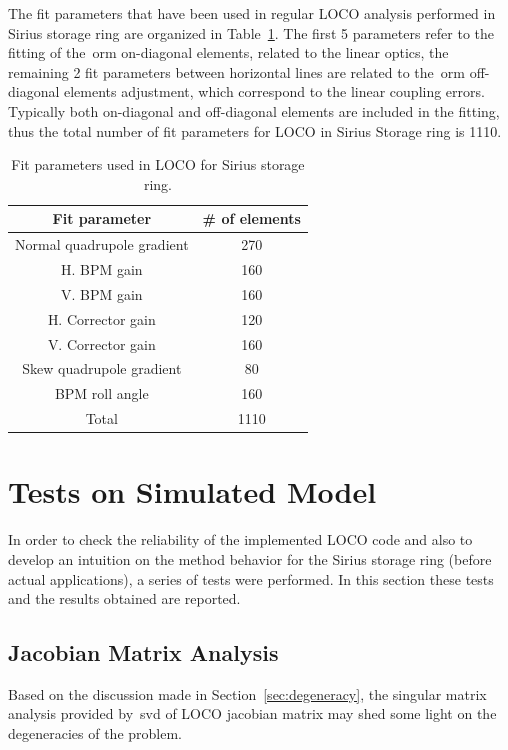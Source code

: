 The fit parameters that have been used in regular LOCO analysis performed in Sirius storage ring are organized in Table~\ref{tab:fit_params}. The first 5 parameters refer to the fitting of the~\gls{orm} on-diagonal elements, related to the linear optics, the remaining 2 fit parameters between horizontal lines are related to the~\gls{orm} off-diagonal elements adjustment, which correspond to the linear coupling errors. Typically both on-diagonal and off-diagonal elements are included in the fitting, thus the total number of fit parameters for LOCO in Sirius Storage ring is 1110.
\begin{table}
    \centering
    \caption{Fit parameters used in LOCO for Sirius storage ring.}
    \label{tab:fit_params}
    \begin{tabular}{cc}
        \toprule\toprule
        Fit parameter & \# of elements \\
        \hline
        Normal quadrupole gradient & 270 \\
        H. BPM gain & 160 \\
        V. BPM gain & 160 \\
        H. Corrector gain & 120 \\
        V. Corrector gain & 160 \\
        \hline
        Skew quadrupole gradient & 80 \\
        BPM roll angle & 160 \\ 
        \hline
        Total & 1110 \\
        \bottomrule\bottomrule
    \end{tabular}
\end{table}

\section{Tests on Simulated Model}
In order to check the reliability of the implemented LOCO code and also to develop an intuition on the method behavior for the Sirius storage ring (before actual applications), a series of tests were performed. In this section these tests and the results obtained are reported.
\subsection{Jacobian Matrix Analysis}
Based on the discussion made in Section~\ref{sec:degeneracy}, the singular matrix analysis provided by~\gls{svd} of LOCO jacobian matrix may shed some light on the degeneracies of the problem.

